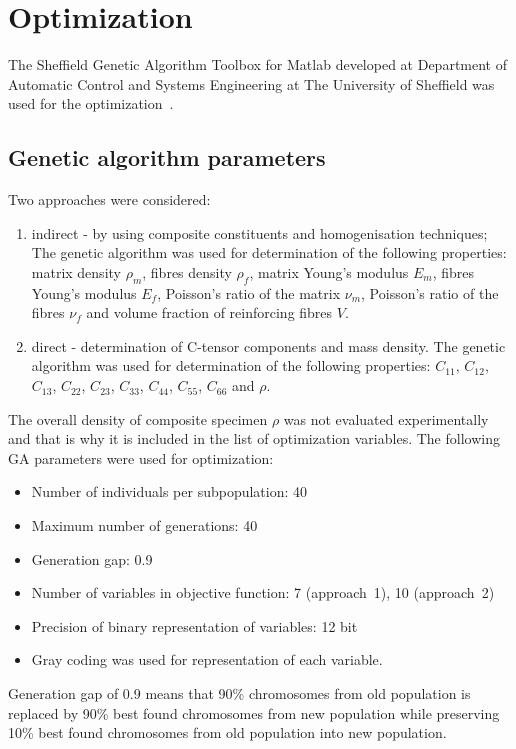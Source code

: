 \documentclass[preprint,12pt]{elsarticle}
\begin{document}
	\section{Optimization \label{sec:optimization}}
	The Sheffield Genetic Algorithm Toolbox for Matlab developed at Department of Automatic Control and Systems Engineering at The University of Sheffield was used for the optimization~\cite{Chipperfield1994}.
	\subsection{Genetic algorithm parameters}
	Two approaches were considered:
	\begin{enumerate}
	\item indirect - by using composite constituents and homogenisation techniques;
	The genetic algorithm was used for determination of the following properties:  matrix density $\rho_m$, fibres density $\rho_f$, matrix Young's modulus $E_m$, fibres Young's modulus $E_f$, Poisson's ratio of the matrix $\nu_m$, Poisson's ratio of the fibres $\nu_f$ and volume fraction of reinforcing fibres $V$. 
	\item direct - determination of C-tensor components and mass density.
	The genetic algorithm was used for determination of the following properties: $C_{11}$, $C_{12}$, $C_{13}$,  $C_{22}$, $C_{23}$, $C_{33}$, $C_{44}$, $C_{55}$, $C_{66}$ and $\rho$.
	\end{enumerate}
	The overall density of composite specimen $\rho$ was not evaluated experimentally and that is why it is included in the list of optimization variables.
	The following GA parameters were used for optimization:
	\begin{itemize}
		\item Number of individuals per subpopulation: 40
		\item Maximum number of generations: 40
		\item Generation gap: 0.9
		\item Number of variables in objective function: 7 (approach~1), 10 (approach~2)
		\item Precision of binary representation of variables: 12 bit
		\item Gray coding was used for representation of each variable.
   \end{itemize}
    Generation gap of 0.9 means that 90\% chromosomes from old population is replaced by 90\% best found chromosomes from new population while preserving 10\% best found chromosomes from old population into new population.
    
\end{document}
